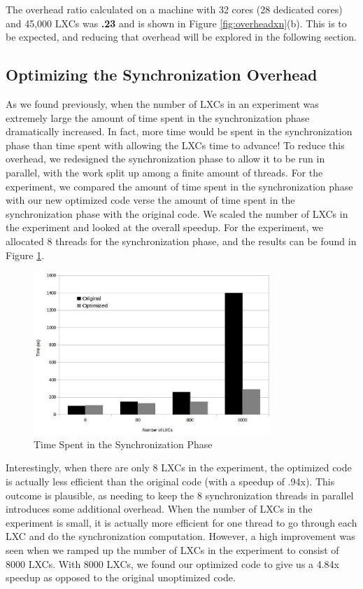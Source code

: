 The overhead ratio calculated on a machine with 32 cores (28 dedicated cores) and 45,000 LXCs was {\bf .23} and is shown in Figure \ref{fig:overheadxn}(b). This is to be expected, and reducing that overhead will be explored in the following section.  
\subsection{Optimizing the Synchronization Overhead}
As we found previously, when the number of LXCs in an experiment was extremely large the amount of time spent in the synchronization phase dramatically increased. In fact, more time would be spent in the synchronization phase than time spent with allowing the LXCs time to advance! To reduce this overhead, we redesigned the synchronization phase to allow it to be run in parallel, with the work split up among a finite amount of threads. For the experiment, we compared the amount of time spent in the synchronization phase with our new optimized code verse the amount of time spent in the synchronization phase with the original code. We scaled the number of LXCs in the experiment and looked at the overall speedup. For the experiment, we allocated 8 threads for the synchronization phase, and the results can be found in Figure \ref{fig:sync_optimized}.
\begin{figure} \centering
      \includegraphics[width=0.8\textwidth]{images/sync_optimized.eps} 
    \caption{Time Spent in the Synchronization Phase} 
    \label{fig:sync_optimized} 
  \end{figure}  
Interestingly, when there are only 8 LXCs in the experiment, the optimized code is actually less efficient than the original code (with a speedup of .94x). This outcome is plausible, as needing to keep the 8 synchronization threads in parallel introduces some additional overhead. When the number of LXCs in the experiment is small, it is actually more efficient for one thread to go through each LXC and do the synchronization computation. However, a high improvement was seen when we ramped up the number of LXCs in the experiment to consist of 8000 LXCs. With 8000 LXCs, we found our optimized code to give us a 4.84x speedup as opposed to the original unoptimized code.
